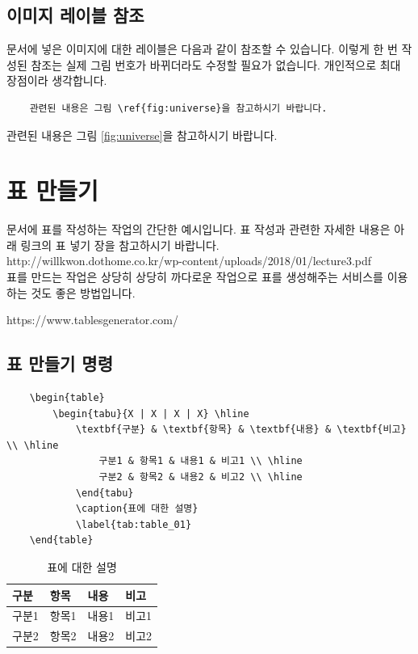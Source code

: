 \subsection{이미지 레이블 참조}
문서에 넣은 이미지에 대한 레이블은 다음과 같이 참조할 수 있습니다. 이렇게 한 번 작성된 참조는
실제 그림 번호가 바뀌더라도 수정할 필요가 없습니다. 개인적으로  최대 장점이라 생각합니다.

\begin{verbatim}
    관련된 내용은 그림 \ref{fig:universe}을 참고하시기 바랍니다. 
\end{verbatim}

관련된 내용은 그림 \ref{fig:universe}을 참고하시기 바랍니다.

\section{표 만들기} 
문서에 표를 작성하는 작업의 간단한 예시입니다. 표 작성과 관련한 자세한 내용은 아래 링크의 표 넣기
장을 참고하시기 바랍니다. \\

http://willkwon.dothome.co.kr/wp-content/uploads/2018/01/lecture3.pdf \\

표를 만드는 작업은 상당히  상당히 까다로운 작업으로 표를 생성해주는 서비스를 이용하는 것도
좋은 방법입니다.

https://www.tablesgenerator.com/

\subsection{표 만들기 명령}
\begin{verbatim}
    \begin{table}
        \begin{tabu}{X | X | X | X} \hline
            \textbf{구분} & \textbf{항목} & \textbf{내용} & \textbf{비고} \\ \hline
                구분1 & 항목1 & 내용1 & 비고1 \\ \hline
                구분2 & 항목2 & 내용2 & 비고2 \\ \hline
            \end{tabu}
            \caption{표에 대한 설명}
            \label{tab:table_01}
    \end{table}
\end{verbatim}

\begin{table}[h!]
    \begin{tabu}{X | X | X | X} \hline
        \textbf{구분} & \textbf{항목} & \textbf{내용} & \textbf{비고} \\ \hline
            구분1 & 항목1 & 내용1 & 비고1 \\ \hline
            구분2 & 항목2 & 내용2 & 비고2 \\ \hline
        \end{tabu}
        \caption{표에 대한 설명}
        \label{tab:table_01}
\end{table}

